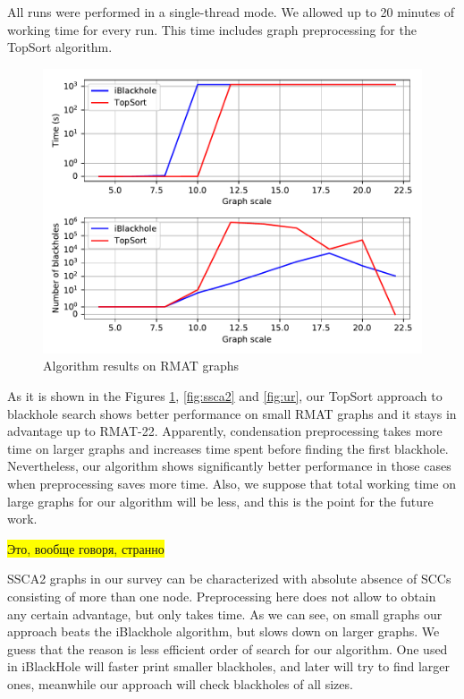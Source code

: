 \documentclass{svproc}
\newcommand{\FIXME}[1]{ %
	\colorbox{yellow}{#1}
}
\newcommand{\FIXME}[1]{ %
}
\begin{document}
All runs were performed in a single-thread mode. We allowed up to 20 minutes of working time for every run. This time includes graph preprocessing for the TopSort algorithm.

\begin{figure}[H]
	\includegraphics[width=\linewidth]{rmat.pdf}
	\caption{Algorithm results on RMAT graphs}
	\label{fig:rmat}
\end{figure}

As it is shown in the Figures \ref{fig:rmat}, \ref{fig:ssca2} and \ref{fig:ur}, our TopSort approach to blackhole search shows better performance on small RMAT graphs and it stays in advantage up to RMAT-22. Apparently, condensation preprocessing takes more time on larger graphs and increases time spent before finding
the first blackhole. Nevertheless, our algorithm shows significantly better performance in those cases when preprocessing saves more time. Also, we suppose
that total working time on large graphs for our algorithm will be less, and this is the point for the future work.

\FIXME{Это, вообще говоря, странно}
SSCA2 graphs in our survey can be characterized with absolute absence of SCCs consisting of more than one node. Preprocessing here does not allow to obtain any
certain advantage, but only takes time. As we can see, on small graphs our approach beats the iBlackhole algorithm, but slows down on larger graphs.
We guess that the reason is less efficient order of search for our algorithm. One used in iBlackHole will faster print smaller blackholes, and later will try
to find larger ones, meanwhile our approach will check blackholes of all sizes.
\end{document}
